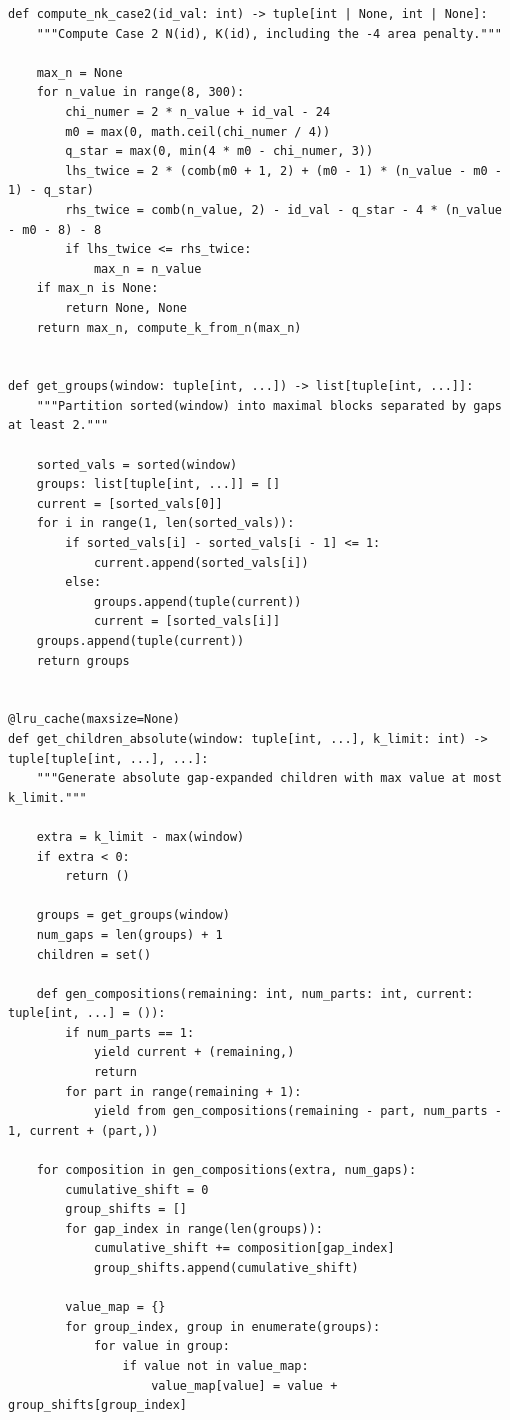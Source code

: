 \documentclass[11pt]{article}
\theoremstyle{plain}
\theoremstyle{definition}
\theoremstyle{remark}
\begin{document}
\begin{lstlisting}
def compute_nk_case2(id_val: int) -> tuple[int | None, int | None]:
    """Compute Case 2 N(id), K(id), including the -4 area penalty."""

    max_n = None
    for n_value in range(8, 300):
        chi_numer = 2 * n_value + id_val - 24
        m0 = max(0, math.ceil(chi_numer / 4))
        q_star = max(0, min(4 * m0 - chi_numer, 3))
        lhs_twice = 2 * (comb(m0 + 1, 2) + (m0 - 1) * (n_value - m0 - 1) - q_star)
        rhs_twice = comb(n_value, 2) - id_val - q_star - 4 * (n_value - m0 - 8) - 8
        if lhs_twice <= rhs_twice:
            max_n = n_value
    if max_n is None:
        return None, None
    return max_n, compute_k_from_n(max_n)


def get_groups(window: tuple[int, ...]) -> list[tuple[int, ...]]:
    """Partition sorted(window) into maximal blocks separated by gaps at least 2."""

    sorted_vals = sorted(window)
    groups: list[tuple[int, ...]] = []
    current = [sorted_vals[0]]
    for i in range(1, len(sorted_vals)):
        if sorted_vals[i] - sorted_vals[i - 1] <= 1:
            current.append(sorted_vals[i])
        else:
            groups.append(tuple(current))
            current = [sorted_vals[i]]
    groups.append(tuple(current))
    return groups


@lru_cache(maxsize=None)
def get_children_absolute(window: tuple[int, ...], k_limit: int) -> tuple[tuple[int, ...], ...]:
    """Generate absolute gap-expanded children with max value at most k_limit."""

    extra = k_limit - max(window)
    if extra < 0:
        return ()

    groups = get_groups(window)
    num_gaps = len(groups) + 1
    children = set()

    def gen_compositions(remaining: int, num_parts: int, current: tuple[int, ...] = ()):
        if num_parts == 1:
            yield current + (remaining,)
            return
        for part in range(remaining + 1):
            yield from gen_compositions(remaining - part, num_parts - 1, current + (part,))

    for composition in gen_compositions(extra, num_gaps):
        cumulative_shift = 0
        group_shifts = []
        for gap_index in range(len(groups)):
            cumulative_shift += composition[gap_index]
            group_shifts.append(cumulative_shift)

        value_map = {}
        for group_index, group in enumerate(groups):
            for value in group:
                if value not in value_map:
                    value_map[value] = value + group_shifts[group_index]


\end{lstlisting}
\end{document}
